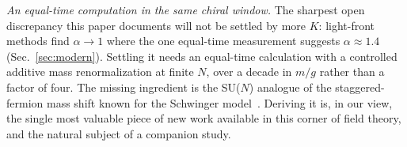 \emph{An equal-time computation in the same chiral window.}  The sharpest
open discrepancy this paper documents will not be settled by more $K$:
light-front methods find $\alpha \to 1$ where the one equal-time
measurement suggests $\alpha \approx 1.4$ (Sec.~\ref{sec:modern}).  Settling
it needs an equal-time calculation with a controlled additive mass
renormalization at finite $N$, over a decade in $m/g$ rather than a factor
of four.  The missing ingredient is the SU($N$) analogue of the
staggered-fermion mass shift known for the Schwinger
model~\cite{Dempsey:2022nys}.  Deriving it is, in our view, the single most
valuable piece of new work available in this corner of field theory, and
the natural subject of a companion study.
